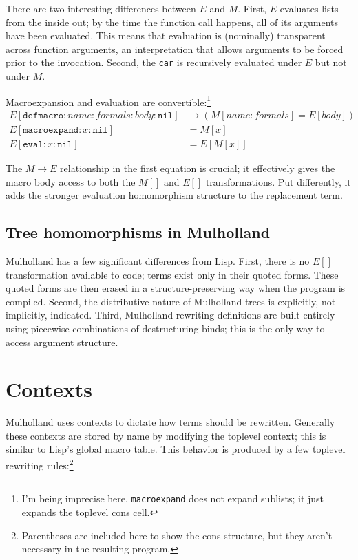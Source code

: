\documentclass{report}
\begin{document}
    There are two interesting differences between $E$ and $M$. First, $E$ evaluates lists from the inside out; by the time the function call happens, all of its arguments have been evaluated.
    This means that evaluation is (nominally) transparent across function arguments, an interpretation that allows arguments to be forced prior to the invocation. Second, the {\tt car} is
    recursively evaluated under $E$ but not under $M$.

    Macroexpansion and evaluation are convertible:\footnote{I'm being imprecise here. {\tt macroexpand} does not expand sublists; it just expands the toplevel cons cell.}
\begin{align*}
E[\texttt{defmacro}:name:formals:body:\texttt{nil}] & \rightarrow (M[name:formals] = E[body]) \\
E[\texttt{macroexpand}:x:\texttt{nil}]              & = M[x] \\
E[\texttt{eval}:x:\texttt{nil}]                     & = E[M[x]]
\end{align*}

    The $M \rightarrow E$ relationship in the first equation is crucial; it effectively gives the macro body access to both the $M[]$ and $E[]$ transformations. Put differently, it adds the
    stronger evaluation homomorphism structure to the replacement term.

\section{Tree homomorphisms in Mulholland}
    Mulholland has a few significant differences from Lisp. First, there is no $E[]$ transformation available to code; terms exist only in their quoted forms. These quoted forms are then
    erased in a structure-preserving way when the program is compiled. Second, the distributive nature of Mulholland trees is explicitly, not implicitly, indicated. Third, Mulholland rewriting
    definitions are built entirely using piecewise combinations of destructuring binds; this is the only way to access argument structure.

\chapter{Contexts}
  Mulholland uses contexts to dictate how terms should be rewritten. Generally these contexts are stored by name by modifying the toplevel context; this is similar to Lisp's global macro
  table. This behavior is produced by a few toplevel rewriting rules:\footnote{Parentheses are included here to show the cons structure, but they aren't necessary in the resulting program.}
\end{document}

